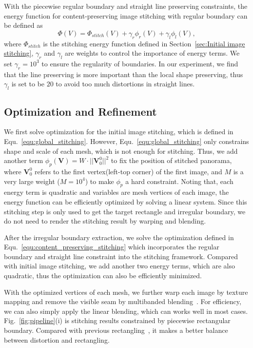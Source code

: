 \documentclass[10pt,journal,compsoc]{IEEEtran}
\begin{document}
With the piecewise regular boundary and straight line preserving constraints,  the energy function for content-preserving image stitching with regular boundary can be defined as
\begin{equation} \label{equ:content_preserving_stitching}
\Phi(V)=\Phi_{stitch}(V)+\gamma_r \phi_r(V)+\gamma_l \phi_l(V),
\end{equation}
where $\Phi_{stitch}$ is the stitching energy function defined in Section~\ref{sec:Initial image stitching}, $\gamma_r$ and $\gamma_l$ are weights to control the importance of energy terms. We set $\gamma_r=10^3$ to ensure the regularity of boundaries.
In our experiment, we find that the line preserving is more important than the local shape preserving, thus $\gamma_l$ is set to be $20$ to avoid too much distortions in straight lines.

\subsection{Optimization and Refinement}
We first solve optimization for the initial image stitching, which is defined in Equ.~\ref{equ:global_stitching}.
However, Equ.~\ref{equ:global_stitching} only constrains shape and scale of each mesh, which is not enough for stitching.
Thus, we add another term $\phi_p(\mathbf{V})=W\cdot||\mathbf{V}_0^0||^2$ to fix the position of stitched panorama, where
$\mathbf{V}_0^0$ refers to the first vertex(left-top corner) of the first image, and $M$ is a very large weight ($M=10^4$) to make $\phi_p$ a hard constraint.
Noting that, each energy term is quadratic and variables are mesh vertices of each image, the energy function can be efficiently optimized by solving a linear system.
Since this stitching step is only used to get the target rectangle and irregular boundary, we do not need to render the stitching result by warping and blending.

After the irregular boundary extraction, we solve the optimization defined in Equ.~\ref{equ:content_preserving_stitching} which incorporates the regular boundary and straight line constraint into the stitching framework.
Compared with initial image stitching, we add another two energy terms, which are also quadratic, thus the optimization can also be efficiently minimized.

With the optimized vertices of each mesh, we further warp each image by texture mapping and remove the visible seam by multibanded blending~\cite{journals/tip/ZhuLWZMLH18}.
For efficiency, we can also simply apply the linear blending, which can works well in most cases.
Fig.~\ref{fig:pipeline}(i) is stitching results constrained by piecewise rectangular boundary. Compared with previous rectangling~\cite{journals/tog/HeC013}, it makes a better balance between distortion and rectangling.
\end{document}
